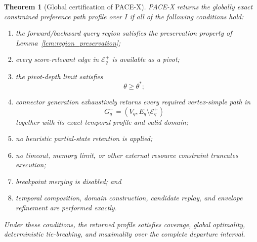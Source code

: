 \documentclass[a4paper,fleqn]{cas-dc}
\newtheorem{theorem}{Theorem}
\begin{document}
\begin{theorem}[Global certification of PACE-X]
\label{thm:pace_x_exactness}
PACE-X returns the globally exact constrained preference path profile over
\(I\) if all of the following conditions hold:

\begin{enumerate}
    \item the forward/backward query region satisfies the preservation
    property of Lemma~\ref{lem:region_preservation};

    \item every score-relevant edge in \(\mathcal{E}_q^{+}\) is available
    as a pivot;

    \item the pivot-depth limit satisfies
    \[
    \theta\geq\theta^{*};
    \]

    \item connector generation exhaustively returns every required
    vertex-simple path in
    \[
    G_q^{-}
    =
    \left(
    V_q,E_q\setminus\mathcal{E}_q^{+}
    \right)
    \]
    together with its exact temporal profile and valid domain;

    \item no heuristic partial-state retention is applied;

    \item no timeout, memory limit, or other external resource constraint
    truncates execution;

    \item breakpoint merging is disabled; and

    \item temporal composition, domain construction, candidate replay, and
    envelope refinement are performed exactly.
\end{enumerate}

Under these conditions, the returned profile satisfies coverage, global
optimality, deterministic tie-breaking, and maximality over the complete
departure interval.
\end{theorem}
\end{document}
